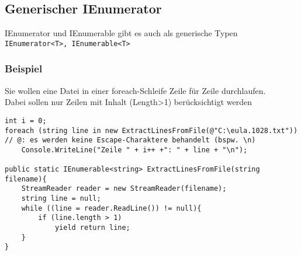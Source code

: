 \subsection{Generischer IEnumerator}
IEnumerator und IEnumerable gibt es auch als generische Typen \lstinline`IEnumerator<T>, IEnumerable<T>`

\subsubsection*{Beispiel}
Sie wollen eine Datei in einer foreach-Schleife Zeile für Zeile durchlaufen.\\
Dabei sollen nur Zeilen mit Inhalt (Length>1) berücksichtigt werden
\begin{lstlisting}[language={[Sharp]C}]
int i = 0; 
foreach (string line in new ExtractLinesFromFile(@"C:\eula.1028.txt"))	// @: es werden keine Escape-Charaktere behandelt (bspw. \n)
	Console.WriteLine("Zeile " + i++ +": " + line + "\n"); 

public static IEnumerable<string> ExtractLinesFromFile(string filename){
	StreamReader reader = new StreamReader(filename);
	string line = null;	
	while ((line = reader.ReadLine()) != null){
		if (line.length > 1)
			yield return line;
	}
}
\end{lstlisting}
